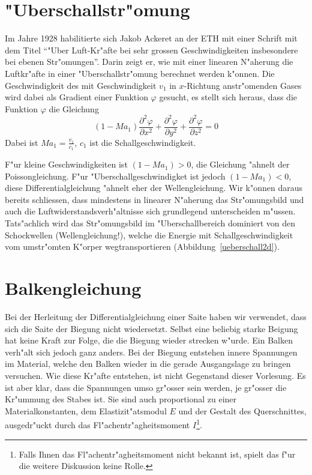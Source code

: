 \section{"Uberschallstr"omung \label{beispiele:ueberschall}}
Im Jahre 1928 habilitierte sich Jakob Ackeret an der ETH mit einer
Schrift mit dem Titel ``"Uber Luft-Kr"afte bei sehr grossen
Geschwindigkeiten insbesondere bei ebenen Str"omungen''. Darin
zeigt er, wie mit einer linearen N"aherung die Luftkr"afte
in einer "Uberschallstr"omung berechnet werden k"onnen.
Die Geschwindigkeit des mit Geschwindigkeit $v_1$ in $x$-Richtung
anstr"omenden
Gases wird dabei als Gradient einer Funktion $\varphi$ gesucht,
es stellt sich heraus, dass die Funktion $\varphi$ die Gleichung
\[
(1-Ma_1)\frac{\partial^2\varphi}{\partial x^2}
+
\frac{\partial^2\varphi}{\partial y^2}
+
\frac{\partial^2\varphi}{\partial z^2}=0
\]
Dabei ist $Ma_1=\frac{v_1}{c_1}$, $c_1$ ist die Schallgeschwindigkeit.

F"ur kleine Geschwindigkeiten ist $(1-Ma_1)>0$, die Gleichung "ahnelt
der Poissongleichung. F"ur "Uberschallgeschwindigket ist jedoch
$(1-Ma_1) < 0$,
diese Differentialgleichung "ahnelt eher der Wellengleichung.
Wir k"onnen daraus bereits schliessen, dass mindestens in linearer
N"aherung das Str"omungsbild und auch die Luftwiderstandsverh"altnisse
sich grundlegend unterscheiden m"ussen.
Tats"achlich wird das Str"omungsbild im "Uberschallbereich dominiert
von den Schockwellen (Wellengleichung!), welche die Energie mit
Schallgeschwindigkeit vom umstr"omten K"orper wegtransportieren
(Abbildung~\ref{ueberschall2d}).

\section{Balkengleichung\label{beispiele:balkengleichung}}
Bei der Herleitung der Differentialgleichung einer Saite haben
wir verwendet, dass sich die Saite der Biegung nicht wiedersetzt.
Selbst eine beliebig starke Beigung hat keine Kraft zur Folge, die
die Biegung wieder strecken w"urde.
Ein Balken verh"alt sich jedoch ganz anders. Bei der Biegung entstehen
innere Spannungen im Material, welche den Balken wieder in die
gerade Ausgangslage zu bringen versuchen.
Wie diese Kr"afte entstehen, ist nicht Gegenstand dieser Vorlesung.
Es ist aber klar, dass die Spannungen umso gr"osser sein werden,
je gr"osser die Kr"ummung des Stabes ist. Sie sind auch proportional
zu einer Materialkonstanten, dem Elastizit"atsmodul $E$ und der
Gestalt des Querschnittes, ausgedr"uckt durch das Fl"achentr"agheitsmoment
$I$\footnote{Falls Ihnen das Fl"achentr"agheitsmoment nicht bekannt ist,
spielt das f"ur die weitere Diskussion keine Rolle.}.


